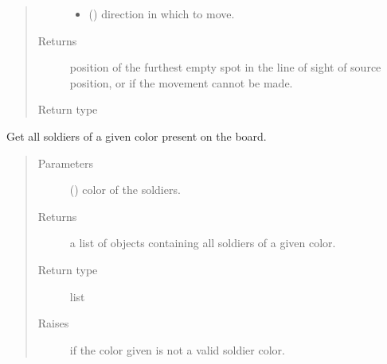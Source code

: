 \documentclass[letterpaper,10pt,english,openany,oneside]{sphinxmanual}
\begin{document}
\begin{fulllineitems}
\begin{fulllineitems}
\begin{quote}
\begin{description}
\begin{itemize}
\item {} 
 () \textendash{} direction in which to move.

\end{itemize}

\item[{Returns}] \leavevmode
position of the furthest empty spot in the line of sight of
source position, or  if the movement cannot be made.

\item[{Return type}] \leavevmode
{\hyperref[\detokenize{util:util.Vec}]{}}

\end{description}\end{quote}

\end{fulllineitems}


\begin{fulllineitems}
\label{\detokenize{neutron:neutron.NeutronBoard.get_soldiers}}
Get all soldiers of a given color present on the board.
\begin{quote}\begin{description}
\item[{Parameters}] \leavevmode
{} () \textendash{} color of the soldiers.

\item[{Returns}] \leavevmode
a list of {\hyperref[\detokenize{neutron:neutron.Soldier}]{}} objects containing all soldiers
of a given color.

\item[{Return type}] \leavevmode
list

\item[{Raises}] \leavevmode
{} \textendash{} if the color given is not a valid soldier color.

\end{description}\end{quote}


\end{fulllineitems}
\end{fulllineitems}
\end{document}
